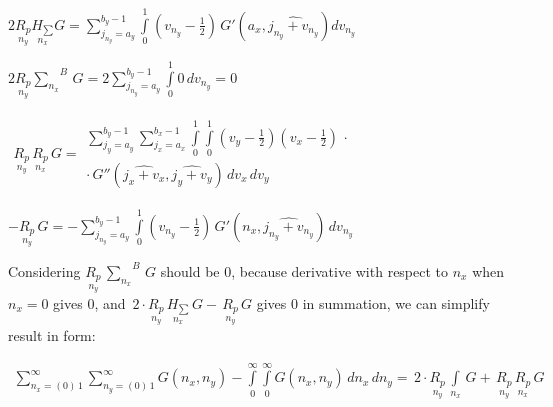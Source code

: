 \documentclass[twoside, 10pt]{article}
\begin{document}
\begin{multicols}{2}
\noindent
\(2 \underset{n_y}{R_{p}}\underset{n_x}{H_{\sum}} G = {\sum\limits_{j_{n_{y}}=a_{y}}^{b_{y} - 1} \int\limits_{0}^{1}  {\left(v_{n_{y}} - \frac{1}{2}\right)}\,G'\left(a_{x}, \widehat{j_{n_{y}} + v_{n_{y}}}\right) {d v_{n_{y}}}}\)

\(2 \underset{n_y}{R_{p}}{\sum\limits_{n_x}^{}}^{B}\,G = 2 {\sum\limits_{j_{n_{y}}=a_{y}}^{b_{y} - 1} \int\limits_{0}^{1} 0\,{d v_{n_{y}}}} = 0\)


\noindent
$\begin{array}{lr}
\underset{n_y}{R_{p}}\,\underset{n_x}{R_{p}}\,G =
\begin{array}{c}
 \sum\limits_{j_{y}=a_{y}}^{b_{y} - 1} \sum\limits_{j_{x}=a_{x}}^{b_{x} - 1} \int\limits_{0}^{1} \int\limits_{0}^{1} \left(v_{y} - \frac{1}{2}\right)  \left(v_{x} - \frac{1}{2}\right) \, \cdot \\
\cdot \, G''\left(\widehat{j_{x} + v_{x}}, \widehat{j_{y} + v_{y}}\right)\,{d v_{x}}\,{d v_{y}}
\end{array}
\end{array}$

\noindent
\(-\underset{n_y}{R_{p}}\,G = -{\sum\limits_{j_{n_{y}}=a_{y}}^{b_{y} - 1} \int\limits_{0}^{1} {\left(v_{n_{y}} - \frac{1}{2}\right)}\,G'\left(n_{x}, \widehat{j_{n_{y}} + v_{n_{y}}}\right)\,{d v_{n_{y}}}}\)

    Considering \(\underset{n_y}{R_{p}}\,{\sum\limits_{n_x}^{}}^{B}\,G\)
should be \(0\), because derivative with respect to \(n_x\) when
\(n_x = 0\) gives \(0\), and
\(\,2\cdot\underset{n_y}{R_{p}}\,\underset{n_x}{H_{\sum}}\,G -\,\underset{n_y}{R_{p}}\,G\)
gives \(0\) in summation, we can simplify result in form:

\end{multicols}

    \begin{equation}
\begin{array}{r}
\sum\limits_{n_x=\left(0\right)\,1}^{\infty}
\sum\limits_{n_y=\left(0\right)\,1}^{\infty}
G\left(n_x, n_y\right)
-
\int\limits_{0}^{\infty}
\int\limits_{0}^{\infty}
G\left(n_x, n_y\right)\,d{n_x}\,d{n_y} =
\,2\cdot\underset{n_y}{R_{p}}\,\int\limits_{n_x}^{}\,G 
+\,\underset{n_y}{R_{p}}\,\underset{n_x}{R_{p}}\,G
\end{array}
\end{equation}
\end{document}
